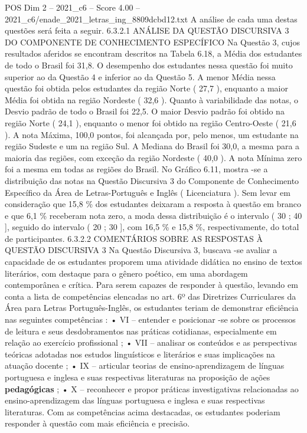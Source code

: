 \begin{textsample}{POS Dim 2 – 2021\_c6 – Score 4.00 – 2021\_c6/enade\_2021\_letras\_ing\_8809dcbd12.txt}
A análise de cada uma destas questões será feita a seguir. 6.3.2.1 ANÁLISE DA QUESTÃO DISCURSIVA 3 DO COMPONENTE DE CONHECIMENTO ESPECÍFICO Na Questão 3, cujos resultados aferidos se encontram descritos na Tabela 6.18, a Média dos estudantes de todo o Brasil foi 31,8.
O desempenho dos estudantes nessa questão foi muito superior ao da Questão 4 e inferior ao da Questão 5.
A menor Média nessa questão foi obtida pelos estudantes da região Norte ( 27,7 ), enquanto a maior Média foi obtida na região Nordeste ( 32,6 ).
Quanto à variabilidade das notas, o Desvio padrão de todo o Brasil foi 22,5.
O maior Desvio padrão foi obtido na região Norte ( 24,1 ), enquanto o menor foi obtido na região Centro-Oeste ( 21,6 ).
A nota Máxima, 100,0 pontos, foi alcançada por, pelo menos, um estudante na região Sudeste e um na região Sul.
A Mediana do Brasil foi 30,0, a mesma para a maioria das regiões, com exceção da região Nordeste ( 40,0 ).
A nota Mínima zero foi a mesma em todas as regiões do Brasil.
No Gráfico 6.11, mostra -se a distribuição das notas na Questão Discursiva 3 do Componente de Conhecimento Específico da Área de Letras-Português e Inglês ( Licenciatura ).
Sem levar em consideração que 15,8 \% dos estudantes deixaram a resposta à questão em branco e que 6,1 \% receberam nota zero, a moda dessa distribuição é o intervalo ( 30 ; 40 ], seguido do intervalo ( 20 ; 30 ], com 16,5 \% e 15,8 \%, respectivamente, do total de participantes. 6.3.2.2 COMENTÁRIOS SOBRE AS RESPOSTAS À QUESTÃO DISCURSIVA 3 Na Questão Discursiva 3, buscava -se avaliar a capacidade de os estudantes proporem uma atividade didática no ensino de textos literários, com destaque para o gênero poético, em uma abordagem contemporânea e crítica.
Para serem capazes de responder à questão, levando em conta a lista de competências elencadas no art. 6º das Diretrizes Curriculares da Área para Letras Português-Inglês, os estudantes teriam de demonstrar eficiência nas seguintes competências : • VI – entender e posicionar -se sobre os processos de leitura e seus desdobramentos nas práticas cotidianas, especialmente em relação ao exercício profissional ; • VII – analisar os conteúdos e as perspectivas teóricas adotadas nos estudos linguísticos e literários e suas implicações na atuação docente ; • IX – articular teorias de ensino-aprendizagem de línguas portuguesa e inglesa e suas respectivas literaturas na proposição de ações \textbf{pedagógicas} ; • X – reconhecer e propor práticas investigativas relacionadas ao ensino-aprendizagem das línguas portuguesa e inglesa e suas respectivas literaturas.
Com as competências acima destacadas, os estudantes poderiam responder à questão com mais eficiência e precisão.

\end{textsample}
